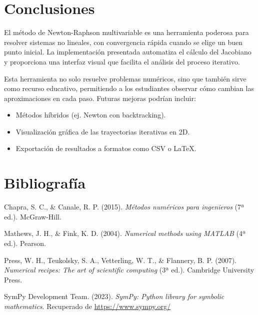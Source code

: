 \documentclass[12pt, letterpaper]{article}
\begin{document}
\section{Conclusiones}
El método de Newton-Raphson multivariable es una herramienta poderosa para resolver sistemas no lineales, con convergencia rápida cuando se elige un buen punto inicial. La implementación presentada automatiza el cálculo del Jacobiano y proporciona una interfaz visual que facilita el análisis del proceso iterativo.

Esta herramienta no solo resuelve problemas numéricos, sino que también sirve como recurso educativo, permitiendo a los estudiantes observar cómo cambian las aproximaciones en cada paso. Futuras mejoras podrían incluir:
\begin{itemize}
    \item Métodos híbridos (ej. Newton con backtracking).
    \item Visualización gráfica de las trayectorias iterativas en 2D.
    \item Exportación de resultados a formatos como CSV o LaTeX.
\end{itemize}

\section*{Bibliografía}
Chapra, S. C., \& Canale, R. P. (2015). \textit{Métodos numéricos para ingenieros} (7ª ed.). McGraw-Hill.

Mathews, J. H., \& Fink, K. D. (2004). \textit{Numerical methods using MATLAB} (4ª ed.). Pearson.

Press, W. H., Teukolsky, S. A., Vetterling, W. T., \& Flannery, B. P. (2007). \textit{Numerical recipes: The art of scientific computing} (3ª ed.). Cambridge University Press.

SymPy Development Team. (2023). \textit{SymPy: Python library for symbolic mathematics}. Recuperado de \url{https://www.sympy.org/}
\end{document}
